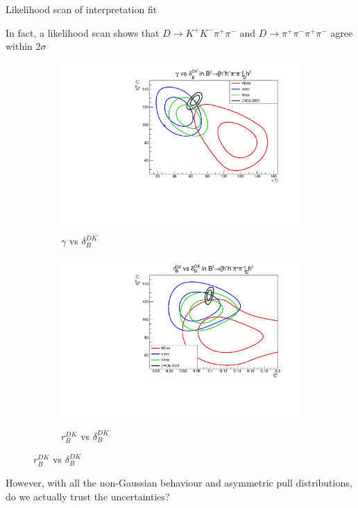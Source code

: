 \documentclass[xcolor={dvipsnames}]{beamer}
\begin{document}
\begin{frame}{Likelihood scan of interpretation fit}
  \begin{center}
    In fact, a likelihood scan shows that $D\to K^+K^-\pi^+\pi^-$ and $D\to\pi^+\pi^-\pi^+\pi^-$ agree within $2\sigma$
  \end{center}
  \begin{figure}
    \centering
    \begin{subfigure}{0.50\textwidth}
      \centering
      \includegraphics[width=1.0\textwidth]{Plots/gamma_deltaB_hhpipi_LHCb_Prob_scan.pdf}
      \caption*{$\gamma$ vs $\delta_B^{DK}$}
    \end{subfigure}%
    \begin{subfigure}{0.50\textwidth}
      \centering
      \includegraphics[width=1.0\textwidth]{Plots/rB_deltaB_hhpipi_LHCb_Prob_scan.pdf}
      \caption*{$r_B^{DK}$ vs $\delta_B^{DK}$}
    \end{subfigure}
  \end{figure}
  \vspace{-0.3cm}
  \begin{center}
    However, with all the non-Gaussian behaviour and asymmetric pull distributions, do we actually trust the uncertainties?
  \end{center}
\end{frame}
\end{document}
